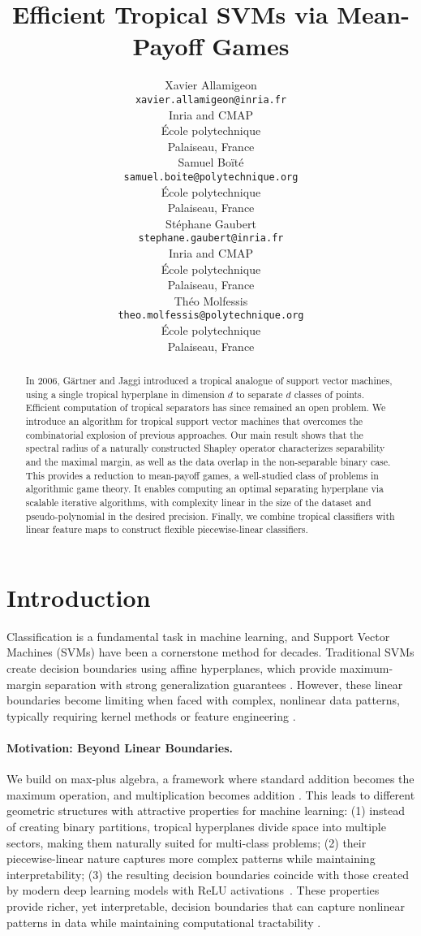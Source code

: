 \documentclass{article}
\title{Efficient Tropical SVMs via Mean-Payoff Games}
\author{
  Xavier Allamigeon \\
  {\small\tt xavier.allamigeon@inria.fr}\\
  Inria and CMAP \\
  École polytechnique \\
  Palaiseau, France \\
  \And
  Samuel Boïté \\
  {\small\tt samuel.boite@polytechnique.org}\\
  École polytechnique \\
  Palaiseau, France \\
  \And
  Stéphane Gaubert \\
  {\small\tt stephane.gaubert@inria.fr}\\
  Inria and CMAP \\
  École polytechnique \\
  Palaiseau, France \\
  \And
  Théo Molfessis \\
  {\small\tt theo.molfessis@polytechnique.org}\\
  École polytechnique \\
  Palaiseau, France \\
}
\begin{document}
\maketitle
\begin{abstract}
    In 2006, Gärtner and Jaggi introduced a tropical analogue of support vector machines, using a single tropical hyperplane in dimension $d$ to separate $d$ classes of points.
    Efficient computation of tropical separators has since remained an open problem. We introduce an algorithm for tropical support vector machines that overcomes the combinatorial explosion of previous approaches.
    Our main result shows that the spectral radius of a naturally constructed Shapley operator characterizes separability and the maximal margin, as well as the data overlap in the non-separable binary case.
    This provides a reduction to mean-payoff games, a well-studied class of problems in algorithmic game theory. It enables computing an optimal separating hyperplane via scalable iterative algorithms, with complexity linear in the size of the dataset and pseudo-polynomial in the desired precision.
    Finally, we combine tropical classifiers with linear feature maps to construct flexible piecewise-linear classifiers.
\end{abstract}

\section{Introduction}\label{sec:intro}

Classification is a fundamental task in machine learning, and Support Vector Machines (SVMs) have been a cornerstone method for decades. Traditional SVMs create decision boundaries using affine hyperplanes, which provide maximum-margin separation with strong generalization guarantees \cite{vapnik1999}. However, these linear boundaries become limiting when faced with complex, nonlinear data patterns, typically requiring kernel methods or feature engineering \cite{scholkopf2002}.

\paragraph{Motivation: Beyond Linear Boundaries.} We build on max-plus algebra, a framework where standard addition becomes the maximum operation, and multiplication becomes addition \cite{maclagan2015}. This leads to different geometric structures with attractive properties for machine learning: (1) instead of creating binary partitions, tropical hyperplanes divide space into multiple sectors, making them naturally suited for multi-class problems; (2) their piecewise-linear nature captures more complex patterns while maintaining interpretability; (3) the resulting decision boundaries coincide with those created by modern deep learning models with ReLU activations~\cite{zhang2018}. These properties provide richer, yet interpretable, decision boundaries that can capture nonlinear patterns in data while maintaining computational tractability \cite{maragos2021}.
\end{document}
